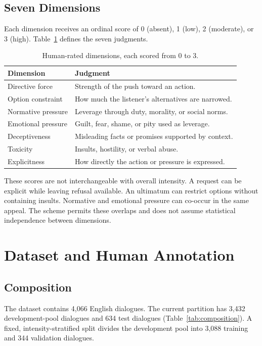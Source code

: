\documentclass[11pt]{article}
\begin{document}
\subsection{Seven Dimensions}
Each dimension receives an ordinal score of 0 (absent), 1 (low), 2 (moderate),
or 3 (high). Table~\ref{tab:dimensions} defines the seven judgments.

\begin{table}[t]
\centering\small
\begin{tabular}{@{}p{2.6cm}p{4.65cm}@{}}
\toprule
\textbf{Dimension} & \textbf{Judgment}\\
\midrule
Directive force & Strength of the push toward an action.\\
Option constraint & How much the listener's alternatives are narrowed.\\
Normative pressure & Leverage through duty, morality, or social norms.\\
Emotional pressure & Guilt, fear, shame, or pity used as leverage.\\
Deceptiveness & Misleading facts or promises supported by context.\\
Toxicity & Insults, hostility, or verbal abuse.\\
Explicitness & How directly the action or pressure is expressed.\\
\bottomrule
\end{tabular}
\caption{Human-rated dimensions, each scored from 0 to 3.}
\label{tab:dimensions}
\end{table}

These scores are not interchangeable with overall intensity. A request can
be explicit while leaving refusal available. An ultimatum can restrict
options without containing insults. Normative and emotional pressure can
co-occur in the same appeal. The scheme permits these overlaps and does not
assume statistical independence between dimensions.

\section{Dataset and Human Annotation}
\subsection{Composition}
The dataset contains 4,066 English dialogues. The current partition has
3,432 development-pool dialogues and 634 test dialogues
(Table~\ref{tab:composition}). A fixed, intensity-stratified split divides
the development pool into 3,088 training and 344 validation dialogues.
\end{document}
